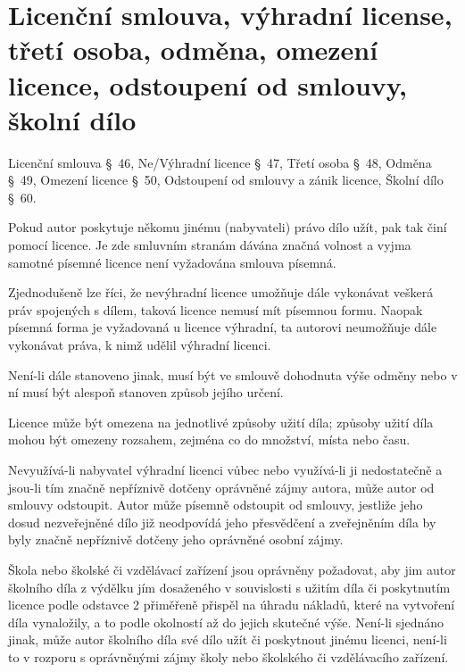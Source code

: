 \section{Licenční smlouva, výhradní license, třetí osoba, odměna, omezení licence, odstoupení od smlouvy, školní dílo}
Licenční smlouva §~46, Ne/Výhradní licence §~47, Třetí osoba §~48, Odměna §~49, Omezení licence §~50, 
Odstoupení od smlouvy a zánik licence, Školní dílo §~60.

Pokud autor poskytuje někomu jinému (nabyvateli) právo dílo užít, pak tak činí pomocí licence. Je zde smluvním stranám 
dávána značná volnost a vyjma samotné písemné licence není vyžadována smlouva písemná.

Zjednodušeně lze říci, že nevýhradní licence umožňuje dále vykonávat veškerá práv spojených s dílem, taková licence 
nemusí mít písemnou formu. Naopak písemná forma je vyžadovaná u licence výhradní, ta autorovi neumožňuje dále vykonávat 
práva, k nimž udělil výhradní licenci.

Není-li dále stanoveno jinak, musí být ve smlouvě dohodnuta výše odměny nebo v ní musí být alespoň stanoven způsob 
jejího určení.

Licence může být omezena na jednotlivé způsoby užití díla; způsoby užití díla mohou být omezeny rozsahem, zejména co do 
množství, místa nebo času.

Nevyužívá-li nabyvatel výhradní licenci vůbec nebo využívá-li ji nedostatečně a jsou-li tím značně nepříznivě
dotčeny oprávněné zájmy autora, může autor od smlouvy odstoupit. Autor může písemně odstoupit od smlouvy,
jestliže jeho dosud nezveřejněné dílo již neodpovídá jeho přesvědčení a zveřejněním díla by byly značně
nepříznivě dotčeny jeho oprávněné osobní zájmy.

Škola nebo školské či vzdělávací zařízení jsou oprávněny požadovat, aby jim autor školního díla z výdělku jím dosaženého 
v souvislosti s užitím díla či poskytnutím licence podle odstavce 2 přiměřeně přispěl na úhradu nákladů, které na 
vytvoření díla vynaložily, a to podle okolností až do jejich skutečné výše. Není-li sjednáno jinak, může autor školního 
díla své dílo užít či poskytnout jinému licenci, není-li to v rozporu s oprávněnými zájmy školy nebo školského či 
vzdělávacího zařízení.